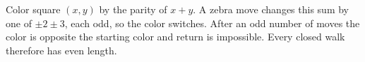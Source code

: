 Color square $(x,y)$ by the parity of $x+y$. A zebra move changes this sum by one of $\pm 2\pm 3$, each odd, so the color switches. After an odd number of moves the color is opposite the starting color and return is impossible. Every closed walk therefore has even length.

